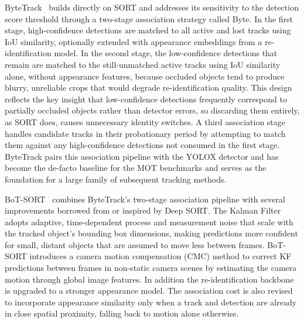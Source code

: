\documentclass[12pt,oneside,bibtotoc,liststotoc]{scrbook}
\begin{document}
ByteTrack~\cite{zhang2022bytetrack} builds directly on SORT and addresses its sensitivity to the detection score threshold
through a two-stage association strategy called Byte. In the first stage, high-confidence detections are
matched to all active and lost tracks using IoU similarity, optionally extended with appearance embeddings
from a re-identification model. In the second stage, the low-confidence detections that remain are matched
to the still-unmatched active tracks using IoU similarity alone, without appearance features, because
occluded objects tend to produce blurry, unreliable crops that would degrade re-identification quality.
This design reflects the key insight that low-confidence detections frequently correspond to partially
occluded objects rather than detector errors, so discarding them entirely, as SORT does, causes
unnecessary identity switches. A third association stage handles candidate tracks in their probationary
period by attempting to match them against any high-confidence detections not consumed in the first stage.
ByteTrack pairs this association pipeline with the YOLOX detector and has become the de-facto baseline for
the MOT benchmarks and serves as the foundation for a large family of subsequent tracking methods.
\cite{advzemovic2025deepLearningMultiObjectTrackingSurvey}

BoT-SORT~\cite{aharon2022BOTSORT} combines ByteTrack's two-stage association pipeline with several improvements borrowed
from or inspired by Deep SORT. The Kalman Filter adopts adaptive, time-dependent process and measurement
noise that scale with the tracked object's bounding box dimensions, making predictions more confident
for small, distant objects that are assumed to move less between frames. BoT-SORT introduces a camera
motion compensation (CMC) method to correct KF predictions between
frames in non-static camera scenes by estimating the camera motion through global image features.
In addition the re-identification backbone is upgraded to a
stronger appearance model. The association cost is also revised to incorporate appearance similarity
only when a track and detection are already in close spatial proximity, falling back to motion alone otherwise.
\end{document}
